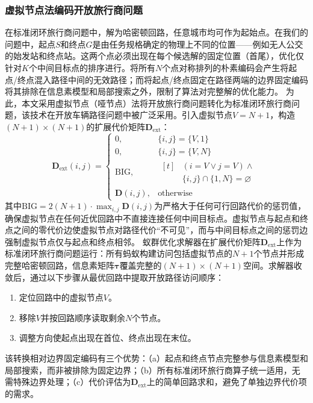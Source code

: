 \documentclass[lettersize,journal]{IEEEtran}
\begin{document}
\subsubsection{虚拟节点法编码开放旅行商问题}
\label{subsec:virtual}
在标准闭环旅行商问题中，解为哈密顿回路，任意城市均可作为起始点。在我们的问题中，起点$S$和终点$G$是由任务规格确定的物理上不同的位置——例如无人公交的始发站和终点站。这两个点必须出现在每个候选解的固定位置（首尾），优化仅针对$K$个中间目标点的排序进行。将所有$N$个点对称排列的朴素编码会产生将起点/终点混入路径中间的无效路径；而将起点/终点固定在路径两端的边界固定编码将其排除在信息素模型和局部搜索之外，限制了算法对完整解的优化能力。
为此，本文采用虚拟节点（哑节点）法将开放旅行商问题转化为标准闭环旅行商问题，该技术在开放车辆路径问题中被广泛采用\cite{ref31,ref32}。引入虚拟节点$V = N + 1$，构造$(N+1) \times (N+1)$的扩展代价矩阵$\mathbf{D}_{\mathrm{ext}}$：
\begin{equation}
\mathbf{D}_{\mathrm{ext}}(i, j) =
\begin{cases}
0, & \{i, j\} = \{V, 1\} \\
0, & \{i, j\} = \{V, N\} \\
\mathrm{BIG}, & \begin{aligned}[t]
& (i = V \lor j = V) \land \\
& \{i, j\} \cap \{1, N\} = \varnothing
\end{aligned} \\
\mathbf{D}(i, j), & \text{otherwise}
\end{cases}
\label{eq:dext}
\end{equation}
其中$\mathrm{BIG} = 2(N+1) \cdot \max_{i,j} \mathbf{D}(i,j)$为严格大于任何可行回路代价的惩罚值，确保虚拟节点在任何近优回路中不直接连接任何中间目标点。虚拟节点与起点和终点之间的零代价边使虚拟节点对路径代价``不可见''，而与中间目标点之间的惩罚边强制虚拟节点仅与起点和终点相邻。
蚁群优化求解器在扩展代价矩阵$\mathbf{D}_{\mathrm{ext}}$上作为标准闭环旅行商问题运行：所有蚂蚁构建访问包括虚拟节点的$N+1$个节点并形成完整哈密顿回路，信息素矩阵$\bm{\tau}$覆盖完整的$(N+1) \times (N+1)$空间。求解器收敛后，通过以下步骤从最优回路中提取开放路径访问顺序：
\begin{enumerate}
\item 定位回路中的虚拟节点$V$。
\item 移除$V$并按回路顺序读取剩余$N$个节点。
\item 调整方向使起点出现在首位、终点出现在末位。
\end{enumerate}
该转换相对边界固定编码有三个优势：（a）起点和终点节点完整参与信息素模型和局部搜索，而非被排除为固定边界；（b）所有标准闭环旅行商算子统一适用，无需特殊边界处理；（c）代价评估为$\mathbf{D}_{\mathrm{ext}}$上的简单回路求和，避免了单独边界代价项的需求。
\end{document}
